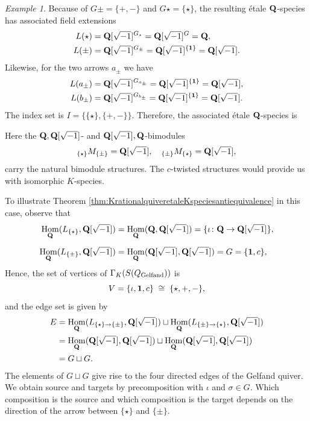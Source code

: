 \documentclass[a4paper,12pt,reqno]{amsart}
\newcommand{\QQ}{{\rm\bf Q}}
\DeclareMathOperator{\Hom}{\mathrm{Hom}}
\theoremstyle{plain}
\theoremstyle{remark}
\newtheorem{example}[theorem]{Example}
\begin{document}
\begin{example}
    Because of $G\pm=\{+,-\}$ and $G\star = \{\star\}$, the resulting \'etale $\QQ$-species has associated field extensions
    \begin{align*}
    L(\star)&=\QQ[\sqrt{-1}]^{G_\star}=\QQ[\sqrt{-1}]^{G}=\QQ,\\
    L(\pm)&=\QQ[\sqrt{-1}]^{G_{\pm}}=\QQ[\sqrt{-1}]^{\{\bf1\}}=\QQ[\sqrt{-1}].
    \end{align*}
    Likewise, for the two arrows $a_\pm$ we have
    \begin{align*}
    L(a_\pm)&=\QQ[\sqrt{-1}]^{G_{a_\pm}}=\QQ[\sqrt{-1}]^{\{\bf1\}}=\QQ[\sqrt{-1}],\\
    L(b_\pm)&=\QQ[\sqrt{-1}]^{G_{b_\pm}}=\QQ[\sqrt{-1}]^{\{\bf1\}}=\QQ[\sqrt{-1}].
    \end{align*}
    The index set is $I=\{\{\star\},\{+,-\}\}$. Therefore, the associated \'etale $\QQ$-species is
    \begin{center}
    \end{center}
    Here the $\QQ,\QQ[\sqrt{-1}]$- and $\QQ[\sqrt{-1}],\QQ$-bimodules
    \[
      {}_{\{\star\}}M_{\{\pm\}}=\QQ[\sqrt{-1}],\quad
      {}_{\{\pm\}}M_{\{\star\}}=\QQ[\sqrt{-1}],
    \]
    carry the natural bimodule structures. The $c$-twisted structures would provide us with isomorphic $K$-species.

  To illustrate Theorem \ref{thm:KrationalquiveretaleKspeciesantiequivalence} in this case, observe that
  \begin{align*}
  \Hom_\QQ(L_{\{\star\}},\QQ[\sqrt{-1}])&=
  \Hom_\QQ(\QQ,\QQ[\sqrt{-1}])=\{\iota\colon\QQ\to\QQ[\sqrt{-1}]\},\\[0.5em]
  \Hom_\QQ(L_{\{\pm\}},\QQ[\sqrt{-1}])&=
  \Hom_\QQ(\QQ[\sqrt{-1}],\QQ[\sqrt{-1}])=G=\{{\bf1},c\},
  \end{align*}
  Hence, the set of vertices of $\Gamma_K(S(Q_{\rm Gelfand}))$ is
  \[
  V=\{\iota,{\bf1},c\}\;\cong\;\{\star,+,-\},
  \]
  and the edge set is given by
  \begin{align*}
  E&=
  \Hom_{\QQ}(L_{\{\star\}\to\{\pm\}},\QQ[\sqrt{-1}])\sqcup
  \Hom_{\QQ}(L_{\{\pm\}\to\{\star\}},\QQ[\sqrt{-1}])\\
  &=
  \Hom_{\QQ}(\QQ[\sqrt{-1}],\QQ[\sqrt{-1}])\sqcup
  \Hom_{\QQ}(\QQ[\sqrt{-1}],\QQ[\sqrt{-1}])\\
  &=G\sqcup G.
  \end{align*}
  The elements of $G\sqcup G$ give rise to the four directed edges of the Gelfand quiver. We obtain source and targets by precomposition with $\iota$ and $\sigma\in G$. Which composition is the source and which composition is the target depends on the direction of the arrow between $\{\star\}$ and $\{\pm\}$.
  \end{example}
\end{document}
